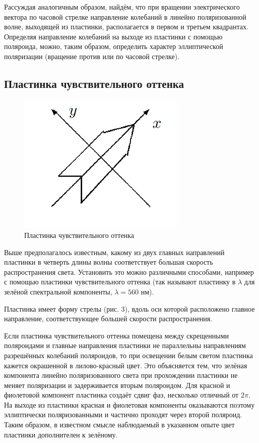 \documentclass[15pt,a5paper,reqno]{article}
\begin{document}
Рассуждая аналогичным образом, найдём, что при вращении электрического вектора по часовой стрелке направление колебаний в линейно поляризованной волне, выходящей из пластинки, располагается в первом и третьем квадрантах. Определяя направление колебаний на выходе из пластинки с помощью поляроида, можно, таким образом, определить характер эллиптической поляризации (вращение против или по часовой стрелке).

\subsection{Пластинка чувствительного оттенка}


\begin{figure}[h!]
    \centering
    \includegraphics[width=8cm]{pics/3.png}
    \caption{Пластинка чувствительного оттенка}
    \label{fig:vac}
\end{figure}


Выше предполагалось известным, какому из двух главных направлений пластинки в четверть длины волны соответствует большая скорость распространения света.
Установить это можно различными способами, например с помощью
пластинки чувствительного оттенка (так называют пластинку в $ \lambda $
для зелёной спектральной компоненты, $ \lambda = 560 $ нм).

Пластинка имеет форму стрелы (рис. 3), вдоль оси которой расположено главное направление, соответствующее большей скорости распространения.

Если пластинка чувствительного оттенка помещена между скрещенными поляроидами и главные направления пластинки не параллельны
направлениям разрешённых колебаний поляроидов, то при освещении
белым светом пластинка кажется окрашенной в лилово-красный цвет.
Это объясняется тем, что зелёная компонента линейно поляризованного света при прохождении пластинки не меняет поляризации и задерживается вторым поляроидом. Для красной и фиолетовой компонент
пластинка создаёт сдвиг фаз, несколько отличный от $ 2\pi $. На выходе
из пластинки красная и фиолетовая компоненты оказываются поэтому
эллиптически поляризованными и частично проходят через второй поляроид. Таким образом, в известном смысле наблюдаемый в указанном
опыте цвет пластинки дополнителен к зелёному.
\end{document}
